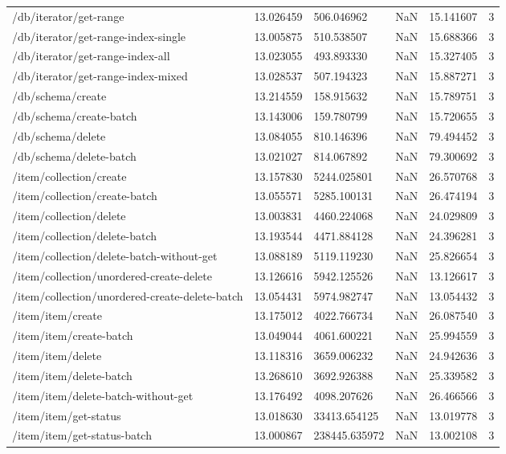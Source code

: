 \begin{tabularx}{\linewidth}{XXXXXX}
/db/iterator/get-range & 13.026459 & 506.046962 & NaN & 15.141607 & 3 \\
/db/iterator/get-range-index-single & 13.005875 & 510.538507 & NaN & 15.688366 & 3 \\
/db/iterator/get-range-index-all & 13.023055 & 493.893330 & NaN & 15.327405 & 3 \\
/db/iterator/get-range-index-mixed & 13.028537 & 507.194323 & NaN & 15.887271 & 3 \\
/db/schema/create & 13.214559 & 158.915632 & NaN & 15.789751 & 3 \\
/db/schema/create-batch & 13.143006 & 159.780799 & NaN & 15.720655 & 3 \\
/db/schema/delete & 13.084055 & 810.146396 & NaN & 79.494452 & 3 \\
/db/schema/delete-batch & 13.021027 & 814.067892 & NaN & 79.300692 & 3 \\
/item/collection/create & 13.157830 & 5244.025801 & NaN & 26.570768 & 3 \\
/item/collection/create-batch & 13.055571 & 5285.100131 & NaN & 26.474194 & 3 \\
/item/collection/delete & 13.003831 & 4460.224068 & NaN & 24.029809 & 3 \\
/item/collection/delete-batch & 13.193544 & 4471.884128 & NaN & 24.396281 & 3 \\
/item/collection/delete-batch-without-get & 13.088189 & 5119.119230 & NaN & 25.826654 & 3 \\
/item/collection/unordered-create-delete & 13.126616 & 5942.125526 & NaN & 13.126617 & 3 \\
/item/collection/unordered-create-delete-batch & 13.054431 & 5974.982747 & NaN & 13.054432 & 3 \\
/item/item/create & 13.175012 & 4022.766734 & NaN & 26.087540 & 3 \\
/item/item/create-batch & 13.049044 & 4061.600221 & NaN & 25.994559 & 3 \\
/item/item/delete & 13.118316 & 3659.006232 & NaN & 24.942636 & 3 \\
/item/item/delete-batch & 13.268610 & 3692.926388 & NaN & 25.339582 & 3 \\
/item/item/delete-batch-without-get & 13.176492 & 4098.207626 & NaN & 26.466566 & 3 \\
/item/item/get-status & 13.018630 & 33413.654125 & NaN & 13.019778 & 3 \\
/item/item/get-status-batch & 13.000867 & 238445.635972 & NaN & 13.002108 & 3 \\

\end{tabularx}
